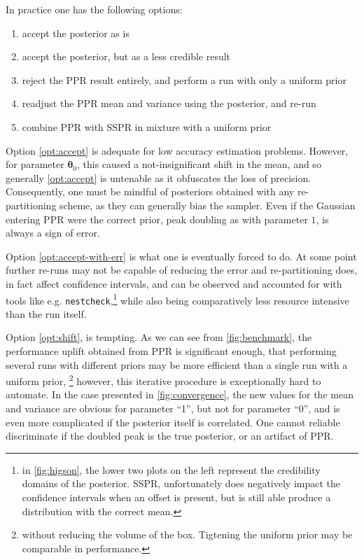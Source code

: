 \documentclass[usenatbib]{mnras}
\begin{document}
In practice one has the following options:
\begin{enumerate}
\item accept the posterior as is \label{opt:accept}
\item accept the posterior, but as a less credible result
\label{opt:accept-with-err}
\item reject the PPR result entirely, and perform a run with only a
uniform prior \label{opt:uniform}
\item readjust the PPR mean and variance using the posterior, and
re-run \label{opt:shift}
\item combine PPR with SSPR in mixture with a uniform prior
\end{enumerate}
Option \ref{opt:accept} is adequate for low accuracy estimation
problems. However, for parameter \(\bm{\theta}_{0}\), this caused a
not-insignificant shift in the mean, and so generally \ref{opt:accept}
is untenable as it obfuscates the loss of precision. Consequently,
one must be mindful of posteriors obtained with any re-partitioning
scheme, as they can generally bias the sampler. Even if the Gaussian
entering PPR were the correct prior, peak doubling as with parameter
\(1\), is always a sign of error.

Option \ref{opt:accept-with-err} is what one is eventually forced to
do. At some point further re-runs may not be capable of reducing the
error and re-partitioning does, in fact affect confidence intervals,
and can be observed and accounted for with tools like
e.g. \texttt{nestcheck},\footnote{in \autoref{fig:higson}, the lower two plots on
the left represent the credibility domains of the posterior. SSPR,
unfortunately does negatively impact the confidence intervals when
an offset is present, but is still able produce a distribution with
the correct mean.} while also being comparatively less resource
intensive than the run itself.

Option \ref{opt:shift}, is tempting. As we can see from
\autoref{fig:benchmark}, the performance uplift obtained from PPR is
significant enough, that performing several runs with different
priors may be more efficient than a single run with a uniform prior,
\footnote{without reducing the volume of the box. Tigtening the uniform
prior may be comparable in performance.} however, this iterative
procedure is exceptionally hard to automate. In the case presented
in \autoref{fig:convergence}, the new values for the mean and variance
are obvious for parameter ``1'', but not for parameter ``0'', and is
even more complicated if the posterior itself is correlated. One
cannot reliable discriminate if the doubled peak is the true
posterior, or an artifact of PPR.
\end{document}
